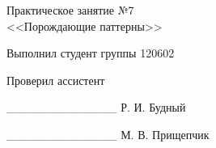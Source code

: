 \thispagestyle{empty}
\setlength{\parindent}{0ex} %

\begin{center}
  Практическое занятие №7 \\
  <<Порождающие паттерны>>
\end{center}

\vspace{1\baselineskip}

\begin{minipage}{.5\linewidth}
    Выполнил студент группы 120602 

    \smallskip

    Проверил ассистент
\end{minipage}
\hfill
\begin{minipage}{.45\linewidth}
  \begin{flushright}
    \_\_\_\_\_\_\_\_\_\_\_\_\_ Р. И. Будный 

    \smallskip

    \_\_\_\_\_\_\_\_\_\_\_\_\_ М. В. Прищепчик 
  \end{flushright}
\end{minipage}

\setlength{\parindent}{1.25cm} %
